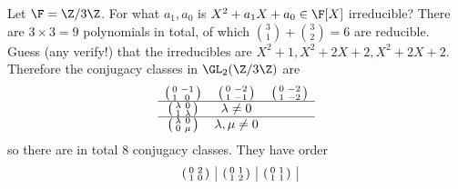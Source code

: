 \documentclass[a4paper]{article}
\begin{document}
\begin{eg}
  Let \(\F = \Z/3\Z\). For what \(a_1, a_0\) is \(X^2 + a_1X + a_0 \in \F[X]\) irreducible? There are \(3 \times 3 = 9\) polynomials in total, of which \(\binom{3}{1} + \binom{3}{2} = 6\) are reducible. Guess (any verify!) that the irreducibles are \(X^2 + 1, X^2 + 2X + 2, X^2 + 2X + 2\). Therefore the conjugacy classes in \(\GL_2(\Z/3\Z)\) are
  \[
    \begin{array}[h]{ccc}
      \begin{psmallmatrix}
        0 & -1 \\
        1 & 0
      \end{psmallmatrix}
          &
            \begin{psmallmatrix}
              0 & -2 \\
              1 & -1
            \end{psmallmatrix}
          &
            \begin{psmallmatrix}
              0 & -2 \\
              1 & -2
            \end{psmallmatrix}
      \\ \hline
      \begin{psmallmatrix}
        \lambda & 0 \\
        1 & \lambda
      \end{psmallmatrix}
          &
            \lambda \neq 0
      \\ \hline
      \begin{psmallmatrix}
        \lambda & 0 \\
        0 & \mu
      \end{psmallmatrix}
          &
            \lambda, \mu \neq 0
    \end{array}
  \]
  so there are in total \(8\) conjugacy classes. They have order
  \[
    \begin{array}[h]{c|c|c|c|c|c}
      \begin{psmallmatrix}
        0 & 2 \\
        1 & 0
      \end{psmallmatrix}
          &
            \begin{psmallmatrix}
              0 & 1 \\
              1 & 2
            \end{psmallmatrix}
          &
            \begin{psmallmatrix}
              0 & 1 \\
              1 & 1
            \end{psmallmatrix}

\end{array}\]
\end{eg}
\end{document}
